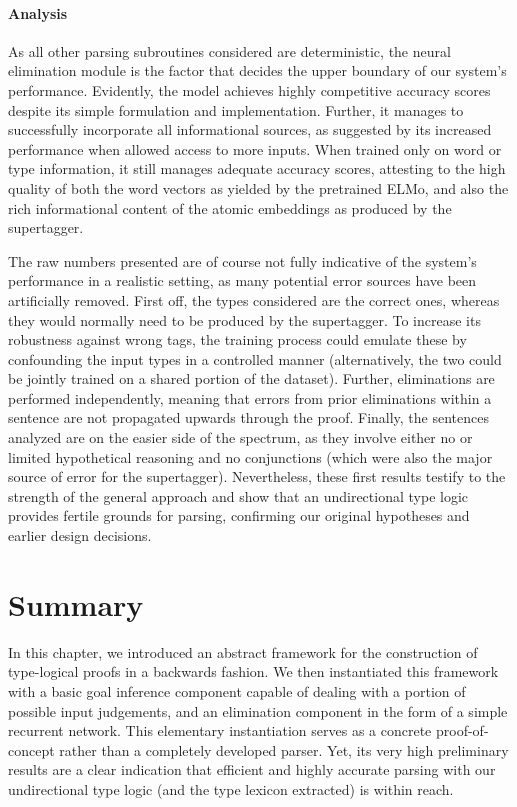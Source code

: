 \paragraph{Analysis}
As all other parsing subroutines considered are deterministic, the neural elimination module is the factor that decides the upper boundary of our system's performance.
Evidently, the model achieves highly competitive accuracy scores despite its simple formulation and implementation.
Further, it manages to successfully incorporate all informational sources, as suggested by its increased performance when allowed access to more inputs.
When trained only on word or type information, it still manages adequate accuracy scores, attesting to the high quality of both the word vectors as yielded by the pretrained ELMo, and also the rich informational content of the atomic embeddings as produced by the supertagger.

The raw numbers presented are of course not fully indicative of the system's performance in a realistic setting, as many potential error sources have been artificially removed.
First off, the types considered are the correct ones, whereas they would normally need to be produced by the supertagger.
To increase its robustness against wrong tags, the training process could emulate these by confounding the input types in a controlled manner (alternatively, the two could be jointly trained on a shared portion of the dataset).
Further, eliminations are performed independently, meaning that errors from prior eliminations within a sentence are not propagated upwards through the proof.
Finally, the sentences analyzed are on the easier side of the spectrum, as they involve either no or limited hypothetical reasoning and no conjunctions (which were also the major source of error for the supertagger).
Nevertheless, these first results testify to the strength of the general approach and show that an undirectional type logic provides fertile grounds for parsing, confirming our original hypotheses and earlier design decisions.

\section{Summary}
In this chapter, we introduced an abstract framework for the construction of type-logical proofs in a backwards fashion.
We then instantiated this framework with a basic goal inference component capable of dealing with a portion of possible input judgements, and an elimination component in the form of a simple recurrent network.
This elementary instantiation serves as a concrete proof-of-concept rather than a completely developed parser.
Yet, its very high preliminary results are a clear indication that efficient and highly accurate parsing with our undirectional type logic (and the type lexicon extracted) is within reach.